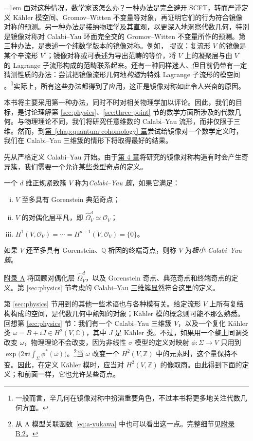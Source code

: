 \begingroup\emergencystretch=1em
面对这种情况，数学家该怎么办？一种办法是完全避开 SCFT，转而严谨定义 Kähler 模空间、Gromov--Witten 不变量等对象，再证明它们的行为符合镜像对称的预测。另一种办法是接纳物理学及其直观，以更深入地洞察代数几何，特别是镜像对称对 Calabi--Yau 环面完全交的 Gromov--Witten 不变量所作的预测。第三种办法，是表述一个纯数学版本的镜像对称。例如， 提议：复流形 $V$ 的镜像是某个辛流形 $V^\circ$；镜像对称或可表述为导出范畴的等价，将 $V$ 上的凝聚层与由 $V^\circ$ 的 Lagrange 子流形构成的范畴联系起来。还有一种同样迷人、但目前仍带有一定猜测性质的办法：尝试把镜像流形几何地\emph{构造}为特殊 Lagrange 子流形的模空间 。\footnote{一般而言，辛几何在镜像对称中扮演重要角色，不过本书将更多地关注代数几何方面。}实际上，所有这些办法都得到了应用，这正是镜像对称如此令人兴奋的原因。\par\endgroup
本书将主要采用第一种办法，同时不时对相关物理学加以评论。因此，我们的目标，是讨论理解第 \ref{sec:physics}、\ref{sec:three-point} 节的数学方面所涉及的代数几何。与物理理论不同，我们将研究任意维数的 Calabi--Yau 流形，而非仅限于三维。然而，到\hyperref[chap:quantum-cohomology]{第~\ref*{chap:quantum-cohomology} 章}尝试给镜像对一个数学定义时，我们在 Calabi--Yau 三维簇的情形下将取得最好的结果。

先从严格定义 Calabi--Yau 开始。由于\hyperref[chap:mirror-constructions]{第 4 章}将研究的镜像对称构造有时会产生奇异簇，我们需要一个允许某些类型奇点的定义。

\begin{definition}\label{def:calabi-yau-variety}
一个 $d$ 维正规紧致簇 $V$ 称为\emph{Calabi--Yau 簇}，如果它满足：
\begin{enumerate}[(i)]
\item $V$ 至多具有 Gorenstein 典范奇点；
\item $V$ 的对偶化层平凡，即 $\widehat\Omega_V^d\simeq\mathcal O_V$；
\item $H^1(V,\mathcal O_V)=\cdots=H^{d-1}(V,\mathcal O_V)=\{0\}$。
\end{enumerate}
如果 $V$ 还至多具有 Gorenstein、$\mathbb Q$ 析因的终端奇点，则称 $V$ 为\emph{极小 Calabi--Yau 簇}。
\end{definition}
\hyperref[app:singular-varieties]{附录 A} 将回顾对偶化层 $\widehat\Omega_V^d$，以及 Gorenstein 奇点、典范奇点和终端奇点的定义。第 \ref{sec:physics} 节考虑的 Calabi--Yau 三维簇显然符合这里的定义。

第 \ref{sec:physics} 节用到的其他一些术语也与各种模有关。给定流形 $V$ 上所有复结构构成的空间，是代数几何中熟知的对象；Kähler 模的概念则可能不那么熟悉。回想第 \ref{sec:physics} 节：我们有一个 Calabi--Yau 三维簇 $V$，以及一个复化 Kähler 类 $\omega=B+iJ\in H^2(V,\mathbb C)$，其中 $J$ 是 Kähler 类。不过，如果用一个整上同调类改变 $\omega$，物理理论不会改变，因为非线性 $\sigma$ 模型的定义对映射 $\phi:\Sigma\to V$ 只用到 $\exp\bigl(2\pi i\int_\Sigma\phi^*(\omega)\bigr)$。\footnote{从 A 模型关联函数~\eqref{eq:a-yukawa} 中也可以看出这一点。完整细节见\hyperref[sec:nonlinear-sigma-models]{附录 B.2}。}当 $\omega$ 改变一个 $H^2(V,\mathbb Z)$ 中的元素时，这个量保持不变。因此，在定义 Kähler 模时，应当对 $H^2(V,\mathbb Z)$ 的像取商。由此得到下面的定义；和前面一样，它也允许某些奇点。

